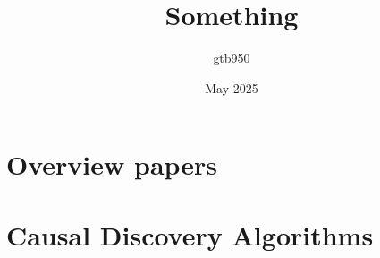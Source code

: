 \documentclass{article}
\title{Something}
\author{gtb950 }
\date{May 2025}
\begin{document}
\maketitle

\section{Overview papers}

\section{Causal Discovery Algorithms}
\end{document}
